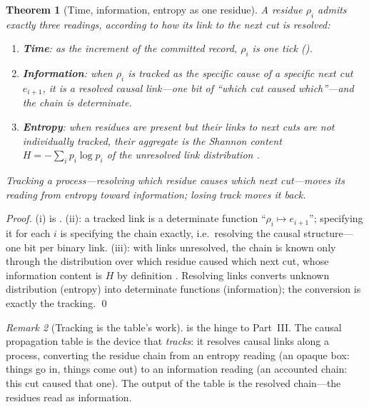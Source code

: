 \documentclass[11pt,twocolumn,a4paper]{article}
\theoremstyle{thmstyle}
\newtheorem{theorem}{Theorem}[section]
\theoremstyle{definition}
\theoremstyle{remark}
\newtheorem{remark}[theorem]{Remark}
\newcommand{\res}{\rho}                  %
\begin{document}
\begin{theorem}[Time, information, entropy as one residue]
\label{thm:three-readings}
A residue $\res_i$ admits exactly three readings, according to how its link
to the next cut is resolved:
\begin{enumerate}[label=\textup{(\roman*)},leftmargin=2.2em]
\item \textbf{Time}: as the increment of the committed record, $\res_i$ is
one tick ().
\item \textbf{Information}: when $\res_i$ is tracked as the specific cause
of a specific next cut $e_{i+1}$, it is a resolved causal link---one bit of
``which cut caused which''---and the chain is determinate.
\item \textbf{Entropy}: when residues are present but their links to next
cuts are not individually tracked, their aggregate is the Shannon content
$H=-\sum_i p_i\log p_i$ of the unresolved link distribution
\citep{shannon1948,cover2006}.
\end{enumerate}
Tracking a process---resolving which residue causes which next cut---moves
its reading from entropy toward information; losing track moves it back.
\end{theorem}

\begin{proof}
(i) is . (ii): a tracked link is a determinate function
``$\res_i\mapsto e_{i+1}$''; specifying it for each $i$ is specifying the
chain exactly, i.e.\ resolving the causal structure---one bit per binary
link. (iii): with links unresolved, the chain is known only through the
distribution over which residue caused which next cut, whose information
content is $H$ by definition \citep{shannon1948}. Resolving links converts
unknown distribution (entropy) into determinate functions (information);
the conversion is exactly the tracking. \qed
\end{proof}

\begin{remark}[Tracking is the table's work]
\label{rem:tracking}
 is the hinge to Part~III. The causal propagation
table is the device that \emph{tracks}: it resolves causal links along a
process, converting the residue chain from an entropy reading (an opaque
box: things go in, things come out) to an information reading (an accounted
chain: this cut caused that one). The output of the table is the resolved
chain---the residues read as information.
\end{remark}
\end{document}
